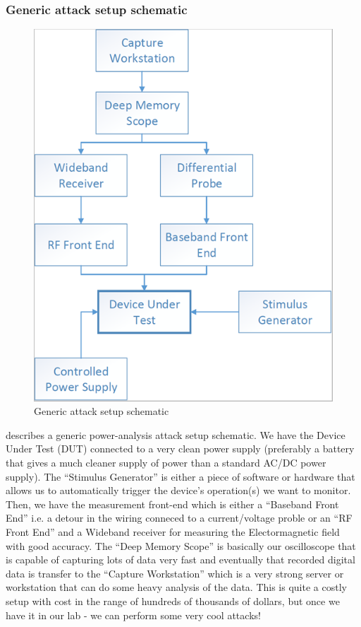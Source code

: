 \subsubsection{Generic attack setup schematic}
\begin{figure}[!ht]
    \centering
    \includegraphics[width=1.0\linewidth]{images/chapter4/attacker_setup_schematic.png}
    \caption{Generic attack setup schematic} \label{fig:attack_setup_schematic}
\end{figure}

 describes a generic power-analysis attack setup schematic.
We have the Device Under Test (DUT) connected to a very clean power supply (preferably a battery that gives a much cleaner supply of power than a standard AC/DC power supply). The ``Stimulus Generator'' is either a piece of software or hardware that allows us to automatically trigger the device's operation(s) we want to monitor. Then, we have the measurement front-end which is either a ``Baseband Front End'' i.e. a detour in the wiring conneced to a current/voltage proble or an ``RF Front End'' and a Wideband receiver for measuring the Electormagnetic field with good accuracy. The ``Deep Memory Scope'' is basically our oscilloscope that is capable of capturing lots of data very fast and eventually that recorded digital data is transfer to the ``Capture Workstation'' which is a very strong server or workstation that can do some heavy analysis of the data.
This is quite a costly setup with cost in the range of hundreds of thousands of dollars, but once we have it in our lab - we can perform some very cool attacks!

